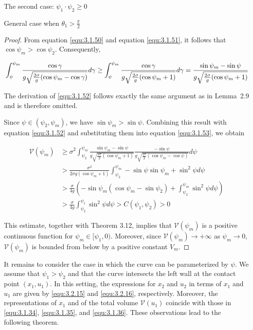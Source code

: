 \documentclass[letterpaper,reqno,10pt,twoside]{amsart}
\theoremstyle{definition}
\theoremstyle{remark}
\begin{document}
\begin{section}{The second case: $\psi_1\cdot \psi_2\geq 0$ }
\begin{subsection}{General case when $\theta_1>\frac{\pi}{2}$}
\begin{proof}
            From equation \eqref{equ:3.1.50} and equation \eqref{equ:3.1.51}, it follows that $\cos\psi_{m}>\cos\psi_2$. Consequently,

            \begin{equation}{\label{equ:3.1.52}}
                \int_{\psi}^{\psi_m}\frac{\cos\gamma}{g\sqrt{\frac{2\sigma}{g}(\cos\psi_m-\cos\gamma)}}d\gamma\geq \int_{\psi}^{\psi_m}\frac{\cos\gamma}{g\sqrt{\frac{2\sigma}{g}(\cos\psi_m+1)}}d\gamma =\frac{\sin\psi_m-\sin\psi}{g\sqrt{\frac{2\sigma}{g}(\cos\psi_m+1)}}
            \end{equation}

            \noindent The derivation of \eqref{equ:3.1.52} follows exactly the same argument as in Lemma~2.9 and is therefore omitted.
            
            Since $\psi\in (\psi_2,\psi_m)$, we have $\sin\psi_m>\sin\psi$.  Combining this result with equation \eqref{equ:3.1.52} and substituting them into equation \eqref{equ:3.1.53}, we obtain

            \begin{align*}
                \mathscr{V}(\psi_m)&\geq \sigma^{2}\int_{\psi_2}^{\psi_m}\frac{\sin\psi_{m}-\sin\psi}{g\sqrt{\frac{2\sigma}{g}(\cos\psi_m+1)}}\frac{-\sin\psi}{g\sqrt{\frac{2\sigma}{g}(\cos\psi_m-\cos\psi)}}d\psi\\
                 &>\frac{\sigma^{2}}{2\sigma g(\cos\psi_{m}+1)}\int_{\psi_2}^{\psi_{m}} -\sin\psi \sin\psi_{m}+\sin^{2}\psi d\psi\\
                 &>\frac{\sigma}{4 g}(-\sin\psi_{m}(\cos\psi_{m}-\sin\psi_2)+\int_{\psi_2}^{\psi_{m}}\sin^{2}\psi d\psi)\\
                 &>\frac{\sigma}{4 g}\int_{\psi_2}^{\psi_1}\sin^{2}\psi d\psi>C(\psi_1,\psi_{2})>0
            \end{align*}
            
            \noindent This estimate, together with Theorem 3.12, implies that ${\mathscr{V}}(\psi_m)$ is a positive continuous function for $\psi_m\in[\psi_1,0)$. Moreover, since ${\mathscr{V}}(\psi_{m})\rightarrow +\infty$ as $\psi_m\rightarrow 0$, $\mathscr{V}(\psi_m)$ is bounded from below by a positive constant $V_{m}$.
            \end{proof}

            It remains to consider the case in which the curve can be parameterized by $\psi$. We assume that $\psi_1>\psi_2$ and that the curve intersects the left wall at the contact point $(x_1,u_1)$. In this setting, the expressions for $x_2$ and $u_2$ in terms of $x_1$ and $u_1$ are given by \eqref{equ:3.2.15} and \eqref{equ:3.2.16}, respectively. Moreover, the representations of $x_1$ and of the total volume $\mathscr{V}(u_1)$ coincide with those in \eqref{equ:3.1.34}, \eqref{equ:3.1.35}, and \eqref{equ:3.1.36}. These observations lead to the following theorem.


\end{subsection}
\end{section}
\end{document}
